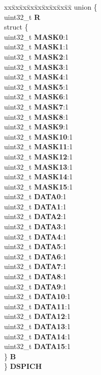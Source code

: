 \begin{DoxyCompactItemize}
\begin{tabbing}
\end{tabbing}\item 
\mbox{\label{structSIU__tag_ab458e9dda7e8802ffd5f3cef6ffbd5ea}} 
\begin{tabbing}
xx\=xx\=xx\=xx\=xx\=xx\=xx\=xx\=xx\=\kill
union \{\\
\>uint32\_t {\bfseries R}\\
\>struct \{\\
\>\>uint32\_t {\bfseries MASK0}:1\\
\>\>uint32\_t {\bfseries MASK1}:1\\
\>\>uint32\_t {\bfseries MASK2}:1\\
\>\>uint32\_t {\bfseries MASK3}:1\\
\>\>uint32\_t {\bfseries MASK4}:1\\
\>\>uint32\_t {\bfseries MASK5}:1\\
\>\>uint32\_t {\bfseries MASK6}:1\\
\>\>uint32\_t {\bfseries MASK7}:1\\
\>\>uint32\_t {\bfseries MASK8}:1\\
\>\>uint32\_t {\bfseries MASK9}:1\\
\>\>uint32\_t {\bfseries MASK10}:1\\
\>\>uint32\_t {\bfseries MASK11}:1\\
\>\>uint32\_t {\bfseries MASK12}:1\\
\>\>uint32\_t {\bfseries MASK13}:1\\
\>\>uint32\_t {\bfseries MASK14}:1\\
\>\>uint32\_t {\bfseries MASK15}:1\\
\>\>uint32\_t {\bfseries DATA0}:1\\
\>\>uint32\_t {\bfseries DATA1}:1\\
\>\>uint32\_t {\bfseries DATA2}:1\\
\>\>uint32\_t {\bfseries DATA3}:1\\
\>\>uint32\_t {\bfseries DATA4}:1\\
\>\>uint32\_t {\bfseries DATA5}:1\\
\>\>uint32\_t {\bfseries DATA6}:1\\
\>\>uint32\_t {\bfseries DATA7}:1\\
\>\>uint32\_t {\bfseries DATA8}:1\\
\>\>uint32\_t {\bfseries DATA9}:1\\
\>\>uint32\_t {\bfseries DATA10}:1\\
\>\>uint32\_t {\bfseries DATA11}:1\\
\>\>uint32\_t {\bfseries DATA12}:1\\
\>\>uint32\_t {\bfseries DATA13}:1\\
\>\>uint32\_t {\bfseries DATA14}:1\\
\>\>uint32\_t {\bfseries DATA15}:1\\
\>\} {\bfseries B}\\
\} {\bfseries DSPICH}\\


\end{tabbing}
\end{DoxyCompactItemize}
